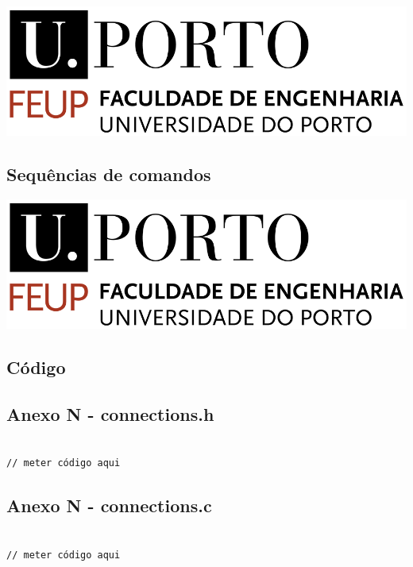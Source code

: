 \documentclass[11pt]{article}
\begin{document}
\includegraphics[width=\textwidth]{feup_logo.png}

\subsection{Sequências de comandos}

\includegraphics[width=\textwidth]{feup_logo.png}

\subsection{Código}

\subsection{ Anexo N - connections.h}

\begin{lstlisting}[style=CStyle]

// meter código aqui

\end{lstlisting}

\subsection{ Anexo N - connections.c}

\begin{lstlisting}[style=CStyle]

// meter código aqui

\end{lstlisting}
\end{document}
